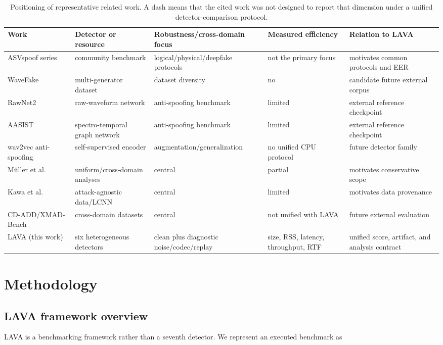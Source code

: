 \documentclass[10pt,journal]{IEEEtran}
\begin{document}
\begin{table}[htbp]
\centering
\small
\caption{Positioning of representative related work. A dash means that the cited work was not designed to report that dimension under a unified detector-comparison protocol.}
\label{tab:1}
\begin{tabularx}{\textwidth}{lXXXX}
\toprule
Work & Detector or resource & Robustness/cross-domain focus & Measured efficiency & Relation to LAVA \\
\midrule
ASVspoof series \cite{wu2015asvspoof,kinnunen2017asvspoof,todisco2019asvspoof,yamagishi2021asvspoof,kinnunen2018tdcf} & community benchmark & logical/physical/deepfake protocols & not the primary focus & motivates common protocols and EER \\
WaveFake \cite{frank2021wavefake} & multi-generator dataset & dataset diversity & no & candidate future external corpus \\
RawNet2 \cite{tak2021rawnet2} & raw-waveform network & anti-spoofing benchmark & limited & external reference checkpoint \\
AASIST \cite{jung2022aasist} & spectro-temporal graph network & anti-spoofing benchmark & limited & external reference checkpoint \\
wav2vec anti-spoofing \cite{tak2022wav2vec} & self-supervised encoder & augmentation/generalization & no unified CPU protocol & future detector family \\
Müller et al. \cite{muller2022generalize,muller2024harder} & uniform/cross-domain analyses & central & partial & motivates conservative scope \\
Kawa et al. \cite{kawa2022attack} & attack-agnostic data/LCNN & central & limited & motivates data provenance \\
CD-ADD/XMAD-Bench \cite{li2024crossdomain,ciobanu2026xmad} & cross-domain datasets & central & not unified with LAVA & future external evaluation \\
LAVA (this work) & six heterogeneous detectors & clean plus diagnostic noise/codec/replay & size, RSS, latency, throughput, RTF & unified score, artifact, and analysis contract \\
\bottomrule
\end{tabularx}
\end{table}
\section{Methodology}
\subsection{LAVA framework overview}
LAVA is a benchmarking framework rather than a seventh detector. We represent an executed benchmark as
\end{document}
